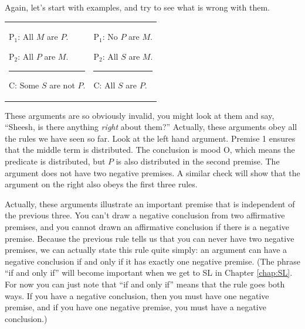 Again, let's start with examples, and try to see what is wrong with them.

\begin{tabu}{p{.5\linewidth}p{.5\linewidth}}

\begin{earg}
\item[P$_1$:] All $M$ are $P$.
\item[P$_2$:] All $P$ are $M$.
\vspace{-.5em}
\item [] \rule{0.4\linewidth}{.5pt} 
\item[C:] Some $S$ are not $P$.
\end{earg}

&

\begin{earg}
\item[P$_1$:] No $P$ are $M$.
\item[P$_2$:] All $S$ are $M$.
\vspace{-.5em}
\item [] \rule{0.4\linewidth}{.5pt} 
\item[C:] All $S$ are $P$.
\end{earg}

\end{tabu}

These arguments are so obviously invalid, you might look at them and say, ``Sheesh, is there anything \emph{right} about them?'' Actually, these arguments obey all the rules we have seen so far. Look at the left hand argument. Premise 1 ensures that the middle term is distributed. The conclusion is mood O, which means the predicate is distributed, but $P$ is also distributed in the second premise. The argument does not have two negative premises. A similar check will show that the argument on the right also obeys the first three rules. 

 Actually, these arguments illustrate an important premise that is independent of the previous three. You can't draw a negative conclusion from two affirmative premises, and you cannot drawn an affirmative conclusion if there is a negative premise. Because the previous rule tells us that you can never have two negative premises, we can actually state this rule quite simply: an argument can have a negative conclusion if and only if it has exactly one negative premise. (The phrase ``if and only if'' will become important when we get to SL in Chapter \ref{chap:SL}. For now you can just note that ``if and only if'' means that the rule goes both ways. If you have a negative conclusion, then you must have one negative premise, and if you have one negative premise, you must have a negative conclusion.) 

